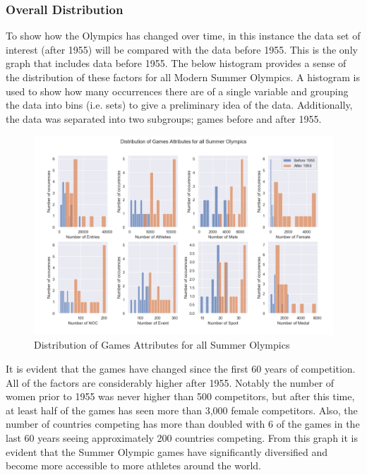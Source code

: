 \documentclass[a4 paper, 12pt]{article}
\begin{document}
    \subsubsection{Overall Distribution}
    To show how the Olympics has changed over time, in this instance the data set of interest (after 1955) will be compared with the data before 1955. This is the only graph that includes data before 1955. The below histogram provides a sense of the distribution of these factors for all Modern Summer Olympics. A histogram is used to show how many occurrences there are of a single variable and grouping the data into bins (i.e. sets) to give a preliminary idea of the data. Additionally, the data was separated into two subgroups; games before and after 1955.
        \begin{figure} [H]
            \centering
            \includegraphics[width=\textwidth, frame]
                {./images/graph/games_histogram.png}      
                \caption{Distribution of Games Attributes for all Summer Olympics} 
        \end{figure}
    It is evident that the games have changed since the first 60 years of competition. All of the factors are considerably higher after 1955. Notably the number of women prior to 1955 was never higher than 500 competitors, but after this time, at least half of the games has seen more than 3,000 female competitors. Also, the number of countries competing has more than doubled with 6 of the games in the last 60 years seeing approximately 200 countries competing. From this graph it is evident that the Summer Olympic games have significantly diversified and become more accessible to more athletes around the world.
\end{document}
